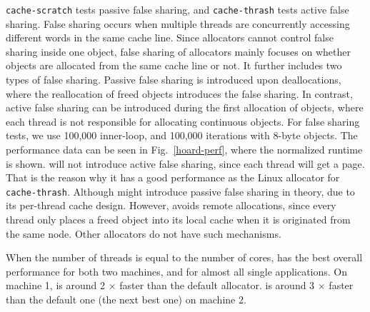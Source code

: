 \texttt{cache-scratch} tests passive false sharing, and \texttt{cache-thrash} tests active false sharing. False sharing occurs when multiple threads are concurrently accessing different words in the same cache line. Since allocators cannot control false sharing inside one object, false sharing of allocators mainly focuses on whether objects are allocated from the same cache line or not. It further includes two types of false sharing.   Passive false sharing is introduced upon deallocations, where the reallocation of freed objects introduces the false sharing. In contrast, active false sharing can be introduced during the first allocation of objects, where each thread is not responsible for allocating continuous objects.   For false sharing tests, we use 100,000 inner-loop, and 100,000 iterations with 8-byte objects. The performance data can be seen in Fig.~\ref{hoard-perf}, where the normalized runtime is shown. \NM{} will not introduce active false sharing, since each thread will get a page. That is the reason why it has a good performance as the Linux allocator for \texttt{cache-thrash}. Although \NM{} might introduce passive false sharing in theory, due to its per-thread cache design. However, \NM{} avoids remote allocations, since every thread only places a freed object into its local cache when it is originated from the same node.  Other allocators do not have such mechanisms.   


When the number of threads is equal to the number of cores, \NM{} has the best overall performance for both two machines, and for almost all single applications. On machine 1, \NM{} is around 2 $\times$ faster than the default allocator. \NM{} is around 3 $\times$ faster than the default one (the next best one) on machine 2.  

 
 

